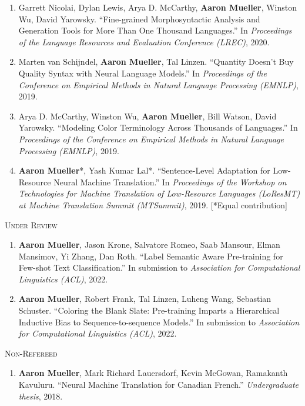 \documentclass[10pt]{article}
\newcommand{\halfblankline}{\quad\vspace{-0.5\baselineskip}\pagebreak[3]}
\begin{document}
\begin{enumerate}[leftmargin=*, topsep=0pt, itemsep=-1ex, partopsep=0ex, parsep=1ex]
	\item Garrett Nicolai, Dylan Lewis, Arya D. McCarthy, \textbf{Aaron Mueller}, Winston Wu, David Yarowsky. ``Fine-grained Morphosyntactic Analysis and Generation Tools for More Than One Thousand Languages.'' In \emph{Proceedings of the Language Resources and Evaluation Conference (LREC)}, 2020.

	\item Marten van Schijndel, \textbf{Aaron Mueller}, Tal Linzen. ``Quantity Doesn't Buy Quality Syntax with Neural Language Models.'' In \emph{Proceedings of the Conference on Empirical Methods in Natural Language Processing (EMNLP)}, 2019.

	\item Arya D. McCarthy, Winston Wu, \textbf{Aaron Mueller}, Bill Watson, David Yarowsky. ``Modeling Color Terminology Across Thousands of Languages.'' In \emph{Proceedings of the Conference on Empirical Methods in Natural Language Processing (EMNLP)}, 2019.

	\item \textbf{Aaron Mueller}*, Yash Kumar Lal*. ``Sentence-Level Adaptation for Low-Resource Neural Machine Translation.'' In \emph{Proceedings of the Workshop on Technologies for Machine Translation of Low-Resource Languages (LoResMT) at Machine Translation Summit (MTSummit)}, 2019. [*Equal contribution]
	\end{enumerate}

	\halfblankline

	\textsc{Under Review}
	\begin{enumerate}[resume,leftmargin=*, topsep=0pt, itemsep=-1ex, partopsep=0ex, parsep=1ex]
	\item \textbf{Aaron Mueller}, Jason Krone, Salvatore Romeo, Saab Mansour, Elman Mansimov, Yi Zhang, Dan Roth. ``Label Semantic Aware Pre-training for Few-shot Text Classification.'' In submission to \emph{Association for Computational Linguistics (ACL)}, 2022.
	
	\item \textbf{Aaron Mueller}, Robert Frank, Tal Linzen, Luheng Wang, Sebastian Schuster. ``Coloring the Blank Slate: Pre-training Imparts a Hierarchical Inductive Bias to Sequence-to-sequence Models.'' In submission to \emph{Association for Computational Linguistics (ACL)}, 2022.
	\end{enumerate}

	\halfblankline

	\textsc{Non-Refereed}
	\begin{enumerate}[resume,leftmargin=*, topsep=0pt, itemsep=-1ex, partopsep=0ex, parsep=1ex]
	\item \textbf{Aaron Mueller}, Mark Richard Lauersdorf, Kevin McGowan, Ramakanth Kavuluru. ``Neural Machine Translation for Canadian French.'' \emph{Undergraduate thesis}, 2018.
	\end{enumerate}
\end{document}
